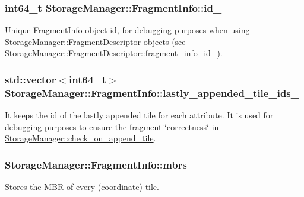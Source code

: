 \subsubsection[{id\+\_\+}]{\setlength{\rightskip}{0pt plus 5cm}int64\+\_\+t Storage\+Manager\+::\+Fragment\+Info\+::id\+\_\+}\label{structStorageManager_1_1FragmentInfo_a602707f31dd459f7618a763c7fdff48c}
Unique \hyperlink{structStorageManager_1_1FragmentInfo}{Fragment\+Info} object id, for debugging purposes when using \hyperlink{classStorageManager_1_1FragmentDescriptor}{Storage\+Manager\+::\+Fragment\+Descriptor} objects (see \hyperlink{classStorageManager_1_1FragmentDescriptor_af22f12dd602adeb5b1fde62593fa1c1b}{Storage\+Manager\+::\+Fragment\+Descriptor\+::fragment\+\_\+info\+\_\+id\+\_\+}). \hypertarget{structStorageManager_1_1FragmentInfo_a850dbb6c8f3f044893ea04d314125e05}{}
\subsubsection[{lastly\+\_\+appended\+\_\+tile\+\_\+ids\+\_\+}]{\setlength{\rightskip}{0pt plus 5cm}std\+::vector$<$int64\+\_\+t$>$ Storage\+Manager\+::\+Fragment\+Info\+::lastly\+\_\+appended\+\_\+tile\+\_\+ids\+\_\+}\label{structStorageManager_1_1FragmentInfo_a850dbb6c8f3f044893ea04d314125e05}
It keeps the id of the lastly appended tile for each attribute. It is used for debugging purposes to ensure the fragment \char`\"{}correctness\char`\"{} in \hyperlink{classStorageManager_a62f43a5b546ca10cb4dcc705f3fd45b8}{Storage\+Manager\+::check\+\_\+on\+\_\+append\+\_\+tile}. \hypertarget{structStorageManager_1_1FragmentInfo_a9d9ff5f675b9c61b5cd3d995d6d964d3}{}
\subsubsection[{mbrs\+\_\+}]{ Storage\+Manager\+::\+Fragment\+Info\+::mbrs\+\_\+}\label{structStorageManager_1_1FragmentInfo_a9d9ff5f675b9c61b5cd3d995d6d964d3}
Stores the M\+B\+R of every (coordinate) tile. \hypertarget{structStorageManager_1_1FragmentInfo_a676e54c719212948c1e58ce5b1d01a0d}{}

